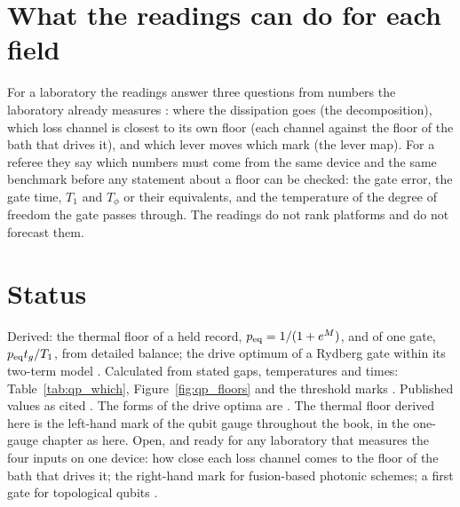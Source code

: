 \section{What the readings can do for each field}\label{sec:qp_use}
For a laboratory the readings answer three questions from numbers the laboratory already measures \interp: where the dissipation goes (the
decomposition), which loss channel is closest to its own floor (each channel against the floor of the bath that drives it), and which lever
moves which mark (the lever map). For a referee they say which numbers must come from the same device and the same benchmark before any
statement about a floor can be checked: the gate error, the gate time, $T_1$ and $T_\phi$ or their equivalents, and the temperature of the
degree of freedom the gate passes through. The readings do not rank platforms and do not forecast them.

\section{Status}
Derived: the thermal floor of a held record, $p_{\rm eq}=1/(1+e^M)$, and of one gate, $p_{\rm eq}t_g/T_1$, from detailed balance; the drive
optimum of a Rydberg gate within its two-term model \derived. Calculated from stated gaps, temperatures and times: Table~\ref{tab:qp_which},
Figure~\ref{fig:qp_floors} and the threshold marks \calc. Published values as cited \observed. The forms of the drive optima are
\conjecture. The thermal floor derived here is the left-hand mark of the qubit gauge throughout the book, in the one-gauge chapter as here.
Open, and ready for any laboratory that measures the four inputs on one device: how close each loss channel comes to the floor of the bath
that drives it; the right-hand mark for fusion-based photonic schemes; a first gate for topological qubits \openprob.
